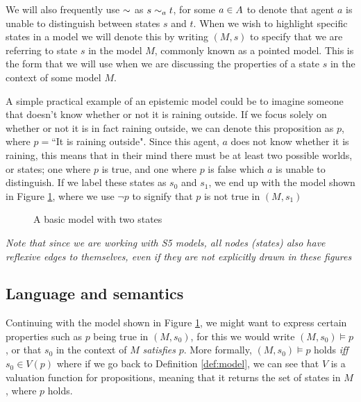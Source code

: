 We will also frequently use $\sim$ as $s\sim_a t$, for some $a\in A$ to denote that agent $a$ is unable to distinguish between states $s$ and $t$. When we wish to highlight specific states in a model we will denote this by writing $(M,s)$ to specify that we are referring to state $s$ in the model $M$, commonly known as a pointed model. This is the form that we will use when we are discussing the properties of a state $s$ in the context of some model $M$. 

A simple practical example of an epistemic model could be to imagine someone that doesn't know whether or not it is raining outside. If we focus solely on whether or not it is in fact raining outside, we can denote this proposition as $p$, where $p = $``It is raining outside". Since this agent, $a$ does not know whether it is raining, this means that in their mind there must be at least two possible worlds, or states; one where $p$ is true, and one where $p$ is false which $a$ is unable to distinguish. If we label these states as $s_0$ and $s_1$, we end up with the model shown in Figure \ref{fig:basicEM}, where we use $\neg p$ to signify that $p$ is not true in $(M,s_1)$

\begin{figure}[h]
	\label{fig:basicEM}
	\centering
	\caption{A basic model with two states}
\end{figure}

\textit{Note that since we are working with S5 models, all nodes (states) also have reflexive edges to themselves, even if they are not explicitly drawn in these figures}

\subsection{Language and semantics}

Continuing with the model shown in Figure \ref{fig:basicEM}, we might want to express certain properties such as $p$ being true in $(M,s_0)$, for this we would write $(M,s_0) \models p$, or that $s_0$ in the context of $M$ \textit{satisfies} $p$. More formally, $(M,s_0) \models p$ holds \textit{iff} $s_0 \in V(p)$ where if we go back to Definition \ref{def:model}, we can see that $V$ is a valuation function for propositions, meaning that it returns the set of states in $M$, where $p$ holds. 

